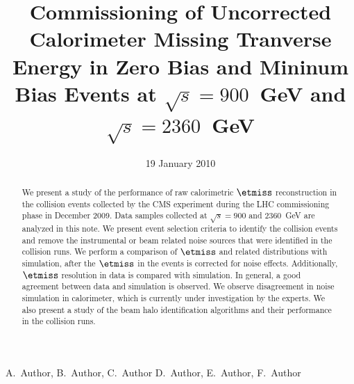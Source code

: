 
\begin{titlepage}


   \date{19 January 2010}

  \title{Commissioning of Uncorrected Calorimeter Missing Tranverse Energy in Zero Bias and Mininum Bias Events at $\sqrt{s}=900$~GeV and $\sqrt{s}=2360$~GeV}

  \begin{Authlist}
    A.~Author, B.~Author, C.~Author
    D.~Author, E.~Author, F.~Author
  \end{Authlist}



  \begin{abstract}
    
    We present a study of the performance of raw calorimetric $\etmiss$ reconstruction in
    the collision events collected by the CMS experiment during the LHC
    commissioning phase in December 2009. Data samples collected at
    $\sqrt{s}=900$ and $2360$~GeV are analyzed in this note. We present
     event selection criteria to identify the collision events and remove the instrumental or beam
    related noise sources that were identified in the collision
    runs. We perform a comparison of $\etmiss$ and related distributions with
    simulation, after the $\etmiss$ in the events is corrected for noise
    effects. Additionally, $\etmiss$ resolution in data is
    compared with simulation. In general, a good agreement between data and simulation is
    observed. We observe disagreement in noise simulation in
    calorimeter, which is currently under investigation by the
    experts. We also present a study of the beam halo identification
    algorithms and their performance in the collision runs.

  \end{abstract} 

  
\end{titlepage}

